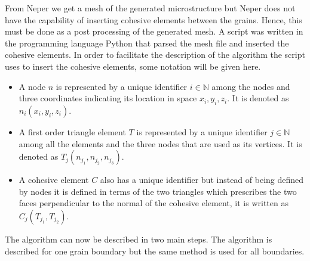 \documentclass[grain_boundary_law.tex]{subfiles}
\begin{document}
From Neper we get a mesh of the generated microstructure but Neper does not have the capability of inserting cohesive elements between the grains. Hence, this must be done as a post processing of the generated mesh. A script was written in the programming language Python that parsed the mesh file and inserted the cohesive elements. In order to facilitate the description of the algorithm the script uses to insert the cohesive elements, some notation will be given here. 

\begin{itemize}
\item A node $n$ is represented by a unique identifier $i \in \mathbb{N}$ among the nodes and three coordinates indicating its location in space $x_i,y_i,z_i$. It is denoted as $n_i(x_i,y_i,z_i)$.
\item A first order triangle element $T$ is represented by a unique identifier $j \in \mathbb{N}$ among all the elements and the three nodes that are used as its vertices. It is denoted as $T_j(n_{j_1}, n_{j_2}, n_{j_3})$. 
\item A cohesive element $C$ also has a unique identifier but instead of being defined by nodes it is defined in terms of the two triangles which prescribes the two faces perpendicular to the normal of the cohesive element, it is written as $C_j(T_{j_1}, T_{j_2})$.
\end{itemize}
The algorithm can now be described in two main steps. The algorithm is described for one grain boundary but the same method is used for all boundaries.
\end{document}
